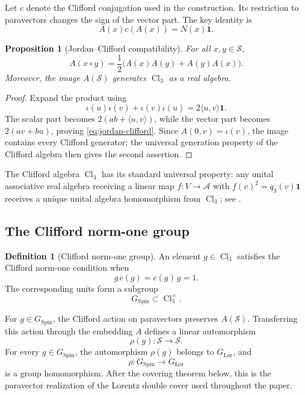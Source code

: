 \documentclass[11pt,a4paper]{article}
\newtheorem{proposition}[theorem]{Proposition}
\theoremstyle{definition}
\newtheorem{definition}[theorem]{Definition}
\theoremstyle{remark}
\newcommand{\Smodel}{\mathcal{S}}
\newcommand{\Cl}{\operatorname{Cl}}
\newcommand{\SpinG}{G_{\mathrm{Spin}}}
\newcommand{\LorG}{G_{\mathrm{Lor}}}
\begin{document}
Let \(c\) denote the Clifford conjugation used in the construction.  Its
restriction to paravectors changes the sign of the vector part.  The key
identity is
\[
   A(x)c(A(x))=N(x)\mathbf{1}.
\tag{3.4}
\]

\begin{proposition}[Jordan--Clifford compatibility]
\label{prop:jordan-clifford}
For all \(x,y\in\Smodel\),
\[
   A(x\circ y)
   =
   \frac12\bigl(A(x)A(y)+A(y)A(x)\bigr).
\tag{3.5}\label{eq:jordan-clifford}
\]
Moreover, the image \(A(\Smodel)\) generates \(\Cl_{3}\) as a real
algebra.
\end{proposition}

\begin{proof}
Expand the product using
\[
   \iota(u)\iota(v)+\iota(v)\iota(u)
   =2\langle u,v\rangle\mathbf{1}.
\]
The scalar part becomes
\(2(ab+\langle u,v\rangle)\), while the vector part becomes
\(2(av+bu)\), proving \eqref{eq:jordan-clifford}.  Since \(A(0,v)=\iota(v)\), the image
contains every Clifford generator; the universal generation property of
the Clifford algebra then gives the second assertion.
\end{proof}

The Clifford algebra \(\Cl_{3}\) has its standard universal property:
any unital associative real algebra receiving a linear map \(f:V\to\mathcal A\) with
\(f(v)^{2}=q_{3}(v)\mathbf1\) receives a unique unital algebra homomorphism from
\(\Cl_{3}\); see \cite{Chevalley,LawsonMichelsohn}.

\subsection{The Clifford norm-one group}

\begin{definition}[Clifford norm-one group]
\label{def:spingroup}
An element \(g\in\Cl_{3}\) satisfies the Clifford norm-one condition when
\[
    g\,c(g)=c(g)\,g=1.
\tag{3.6}
\]
The corresponding units form a subgroup
\[
    \SpinG\subset\Cl_{3}^{\times}.
\tag{3.7}
\]
\end{definition}

For \(g\in\SpinG\), the Clifford action on paravectors preserves
\(A(\Smodel)\).  Transferring this action through the embedding \(A\)
defines a linear automorphism
\[
   \rho(g):\Smodel\longrightarrow\Smodel.
\]
For every \(g\in\SpinG\), the automorphism \(\rho(g)\) belongs to
\(\LorG\), and
\[
   \rho:\SpinG\longrightarrow\LorG
\tag{3.8}
\]
is a group homomorphism.  After the covering theorem below, this is the
paravector realization of the Lorentz double cover used throughout the paper.
\end{document}
